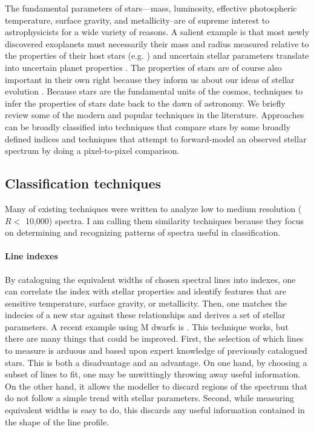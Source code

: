 \documentclass[preprint]{aastex} %
\begin{document}
The fundamental parameters of stars---mass, luminosity, effective photospheric temperature, surface gravity, and metallicity--are of supreme interest to astrophysicists for a wide variety of reasons. A salient example is that most newly discovered exoplanets must necessarily their mass and radius measured relative to the properties of their host stars (e.g. \citealt{tfs+12,blj+12,ssm+13}) and uncertain stellar parameters translate into uncertain planet properties \citep{kan14}. The properties of stars are of course also important in their own right because they inform us about our ideas of stellar evolution \citep{dm97, bca+02}. Because stars are the fundamental units of the cosmos, techniques to infer the properties of stars date back to the dawn of astronomy. We briefly review some of the modern and popular techniques in the literature. Approaches can be broadly classified into techniques that compare stars by some broadly defined indices and techniques that attempt to forward-model an observed stellar spectrum by doing a pixel-to-pixel comparison.

\subsection{Classification techniques}
Many of existing techniques were written to analyze low to medium resolution ($R < $ 10,000) spectra. I am calling them similarity techniques because they focus on determining and recognizing patterns of spectra useful in classification.

\paragraph{Line indexes} By cataloguing the equivalent widths of chosen spectral lines into indexes, one can correlate the index with stellar properties and identify features that are sensitive temperature, surface gravity, or metallicity. Then, one matches the indecies of a new star against these relationships and derives a set of stellar parameters. A recent example using M dwarfs is \citet{nci+14}. This technique works, but there are many things that could be improved. First, the selection of which lines to measure is arduous and based upon expert knowledge of previously catalogued stars. This is both a disadvantage and an advantage. On one hand, by choosing a subset of lines to fit, one may be unwittingly throwing away useful information. On the other hand, it allows the modeller to discard regions of the spectrum that do not follow a simple trend with stellar parameters. Second, while measuring equivalent widths is easy to do, this discards any useful information contained in the shape of the line profile. 
\end{document}
